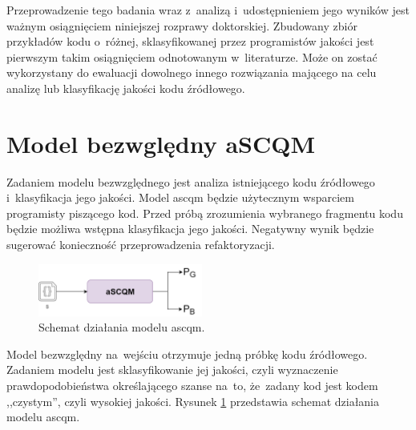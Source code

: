 \documentclass[twoside]{praca}
\begin{document}

Przeprowadzenie tego badania wraz z~analizą i~udostępnieniem jego wyników jest  ważnym osiągnięciem niniejszej rozprawy doktorskiej. Zbudowany zbiór przykładów kodu o~różnej, sklasyfikowanej przez programistów jakości jest pierwszym takim osiągnięciem odnotowanym w~literaturze. Może on zostać wykorzystany do ewaluacji dowolnego innego rozwiązania mającego na celu analizę lub klasyfikację jakości kodu źródłowego.

\pagebreak
\section{Model bezwględny aSCQM}
\label{sec:proj:bz}

Zadaniem modelu bezwzględnego jest analiza istniejącego kodu źródłowego i~klasyfikacja jego jakości. Model \gls{ascqm} będzie użytecznym wsparciem programisty piszącego kod. Przed próbą zrozumienia wybranego fragmentu kodu będzie możliwa wstępna klasyfikacja jego jakości. Negatywny wynik będzie sugerować konieczność przeprowadzenia refaktoryzacji.

\begin{figure}
\centering
\includegraphics[width=0.48\textwidth]{proj/ascqm-s.png}
\caption{Schemat działania modelu \gls{ascqm}.}
\label{fig:proj:ascqm-s}
\end{figure}

Model bezwzględny na~wejściu otrzymuje jedną próbkę kodu źródłowego. Zadaniem modelu jest sklasyfikowanie jej jakości, czyli wyznaczenie prawdopodobieństwa określającego szanse na~to, że~zadany kod jest kodem ,,czystym'', czyli wysokiej jakości. Rysunek \ref{fig:proj:ascqm-s} przedstawia schemat działania modelu \gls{ascqm}. 
\end{document}
